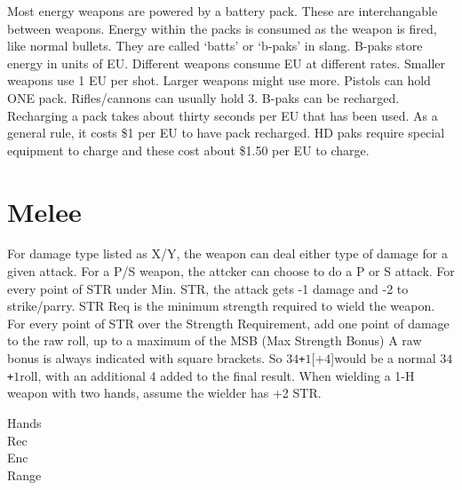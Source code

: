 \documentclass[twoside]{book}
\begin{document}
    {  
     Most energy weapons are powered by a battery pack.
             These are interchangable between weapons. Energy within the
             packs is consumed as the weapon is fired, like normal
             bullets. They are called `batts' or
             `b-paks' in slang. B-paks store energy in units
             of EU. Different weapons consume EU at different rates.
             Smaller weapons use 1 EU per shot. Larger weapons might use
             more. Pistols can hold ONE pack. Rifles/cannons can usually
             hold 3. B-paks can be recharged. Recharging a pack takes
             about thirty seconds per EU that has been used. As a general
             rule, it costs \$1 per EU to have pack recharged. HD paks
             require special equipment to charge and these cost about
             \$1.50 per EU to charge. 
    }
  
    

\section{Melee}
    
    {  
     For damage type listed as X/Y, the weapon can deal
             either type of damage for a given attack. For a P/S weapon,
             the attcker can choose to do a P or S attack. For every
             point of STR under Min. STR, the attack gets -1 damage and
             -2 to strike/parry. STR Req is the minimum strength required
             to wield the weapon. For every point of STR over the
             Strength Requirement, add one point of damage to the raw
             roll, up to a maximum of the MSB (Max Strength Bonus) A raw
             bonus is always indicated with square brackets. So \ensuremath{3}\ensuremath{4}\texttt{+}\ensuremath{1}\textscbf{}[\ensuremath{\texttt{+}\ensuremath{4}}]would be a normal \ensuremath{3}\ensuremath{4}\texttt{+}\ensuremath{1}roll, with an additional 4
             added to the final result. When wielding a 1-H weapon with
             two hands, assume the wielder has +2 STR. 
    }
  
\begin{description}
    
  \item[ Hands ] 
  \item[ Rec ] 
  \item[ Enc ] 
  \item[ Range ] 
\end{description}
  
\end{document}
